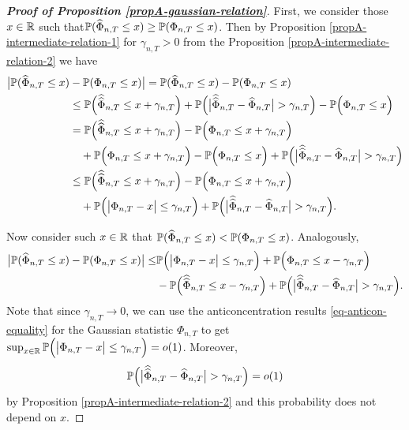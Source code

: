 \documentclass[a4paper,12pt]{article}
\newcommand{\doublehattwo}[1]{\widehat{\widehat{#1}}}
\begin{document}
\begin{proof}[\textnormal{\textbf{Proof of Proposition \ref{propA-gaussian-relation}}}] 
First, we consider those $x\in \mathbb{R}$ such that\linebreak $\mathbb{P}(\widehat{\Phi}_{n,T} \le x) \geq \mathbb{P}(\Phi_{n, T} \le x)$. Then by Proposition \ref{propA-intermediate-relation-1} for $\gamma_{n, T}>0$ from the Proposition \ref{propA-intermediate-relation-2} we have
\begin{align*}
\big| \pr(\widehat{\Phi}_{n, T} \le x) &- \pr(\Phi_{n,T} \le x) \big| = \pr(\widehat{\Phi}_{n, T} \le x) - \pr(\Phi_{n,T} \le x)  \\
&\le \pr\Big(\doublehattwo{\Phi}_{n,T} \le x + \gamma_{n, T}\Big) + \pr \Big(\big|\doublehattwo{\Phi}_{n,T} - \widehat{\Phi}_{n,T}\big| > \gamma_{n, T} \Big)   - \pr\Big(\Phi_{n,T} \le x\Big)  \\
&= \pr\Big(\doublehattwo{\Phi}_{n,T} \le x + \gamma_{n, T}\Big) - \pr\Big(\Phi_{n,T} \le x + \gamma_{n, T}\Big)  \\
& \quad +  \pr\Big(\Phi_{n,T} \le x + \gamma_{n, T}\Big)   - \pr\Big(\Phi_{n,T} \le x\Big) + \pr \Big(\big|\doublehattwo{\Phi}_{n,T} - \widehat{\Phi}_{n,T}\big| > \gamma_{n, T} \Big) \\
&\le \pr\Big(\doublehattwo{\Phi}_{n,T} \le x + \gamma_{n, T}\Big) - \pr\Big(\Phi_{n,T} \le x + \gamma_{n, T}\Big) \\
&\quad + \pr\Big(\big|\Phi_{n,T} - x \big| \le \gamma_{n, T}\Big) + \pr \Big(\big|\doublehattwo{\Phi}_{n,T} - \widehat{\Phi}_{n,T}\big| > \gamma_{n, T} \Big).
\end{align*}

Now consider such $x\in \mathbb{R}$ that $\mathbb{P}(\widehat{\Phi}_{n,T}\le x) < \mathbb{P}(\Phi_{n, T}\le x)$. Analogously, 
\begin{align*}
\big| \pr(\widehat{\Phi}_{n, T} \le x) - \pr(\Phi_{n,T} \le x) \big| \le &\pr\Big(\big|\Phi_{n,T} - x \big| \le \gamma_{n, T}\Big) +\pr\Big(\Phi_{n,T} \le x - \gamma_{n, T}\Big)\\
& -\pr\Big(\doublehattwo{\Phi}_{n,T} \le x - \gamma_{n, T}\Big) +  \pr \Big(\big|\doublehattwo{\Phi}_{n,T} - \widehat{\Phi}_{n,T}\big| > \gamma_{n, T} \Big).  
\end{align*}
Note that since $\gamma_{n,T} \to 0$, we can use the anticoncentration results \eqref{eq-anticon-equality} for the Gaussian statistic $\Phi_{n,T}$ to get $\sup_{x\in \mathbb{R}}\mathbb{P}\Big(\big|\Phi_{n,T} - x \big| \le \gamma_{n, T}\Big) = o(1)$. Moreover, $$\pr \Big(\big|\doublehattwo{\Phi}_{n,T} - \widehat{\Phi}_{n,T}\big| > \gamma_{n, T} \Big) = o(1)$$ by Proposition \ref{propA-intermediate-relation-2} and this probability does not depend on $x$.


\end{proof}
\end{document}
